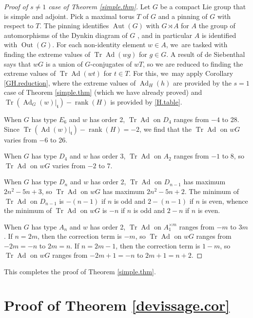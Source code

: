 \documentclass[JEP,XML,SOM,Unicode,NoFloatCountersInSection,published]{cedram}
\theoremstyle{definition}
\newcommand{\mft}{\mathfrak{t}}
\DeclareMathOperator{\Tr}{Tr}
\DeclareMathOperator{\Ad}{Ad}
\DeclareMathOperator{\Aut}{Aut}
\DeclareMathOperator{\Out}{Out}
\DeclareMathOperator{\rank}{rank}
\begin{document}
\begin{proof}[Proof of \texorpdfstring{$s \ne 1$}{s not 1} case of Theorem \ref{simple.thm}]
Let $G$ be a compact Lie group that is simple and adjoint. Pick a maximal torus $T$ of $G$ and a pinning of $G$ with respect to $T$. The pinning identifies $\Aut(G)$ with $G \rtimes A$ for $A$ the group of automorphisms of the Dynkin diagram of $G$ \cite[\S{IX.4.10}, Cor.]{Bou:g7}, and in particular $A$ is identified with $\Out(G)$. For each non-identity element $w \in A$, we~are tasked with finding the extreme values of $\Tr \Ad(wg)$ for $g \in G$.
A result of de Siebenthal \cite[Th.\,on p.\,57]{Sieb} says that $wG$ is a union of $G$-conjugates of $wT$, so we are reduced to finding the extreme values of $\Tr \Ad(wt)$ for $t \in T$. For this, we~may apply Corollary \ref{GH.reduction}, where the extreme values of $\Ad_H(h)$ are provided by the $s = 1$ case of Theorem \ref{simple.thm} (which we have already proved) and $\Tr(\Ad_G(w)\vert_\mft) - \rank(H)$ is provided by \autoref{H.table}.

When $G$ has type $E_6$ and $w$ has order 2, $\Tr \Ad$ on
$D_4$ ranges from $-4$ to 28. Since $\Tr(\Ad(w)|_{\mft})-\rank(H)=-2$,
we find that the $\Tr \Ad$ on $wG$ varies from $-6$ to 26.

When $G$ has type $D_4$ and $w$ has order 3, $\Tr \Ad$ on $A_2$ ranges from $-1$ to $8$, so $\Tr \Ad$ on $wG$ varies from $-2$ to 7.

When $G$ has type $D_n$ and $w$ has order 2, $\Tr \Ad$ on $D_{n-1}$ has
maximum $2n^2 - 5n + 3$, so $\Tr \Ad$ on $wG$ has maximum $2n^2 - 5n + 2$. The minimum of $\Tr \Ad$ on $D_{n-1}$ is $-(n-1)$ if $n$ is odd and $2-(n-1)$ if $n$ is even, whence the minimum of $\Tr \Ad$ on $wG$ is $-n$ if $n$ is odd and $2-n$ if $n$ is even.

When $G$ has type $A_n$ and $w$ has order 2, $\Tr \Ad$ on $A_1^{\times m}$
ranges from $-m$ to $3m$. If $n = 2m$, then the correction term is $-m$,
so $\Tr \Ad$ on $wG$ ranges from $-2m = -n$ to $2m = n$. If $n = 2m-1$,
then the correction term is $1-m$, so $\Tr \Ad$ on $wG$ ranges from $-2m+1
= -n$ to $2m+1 = n+2$.
\end{proof}

This completes the proof of Theorem \ref{simple.thm}.

\section{Proof of Theorem \ref{devissage.cor}} \label{devissage.sec}
\end{document}

